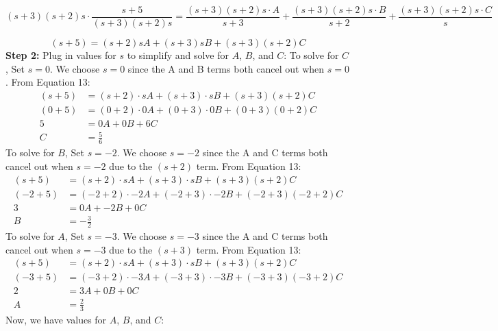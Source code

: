 \documentclass{article}
\begin{document}
\begin{equation}
(s+3)(s+2)s \cdot \frac{s + 5}{(s+3)(s+2)s} =  \frac{(s+3)(s+2)s \cdot A}{s+3} + \frac{(s+3)(s+2)s \cdot B}{s+2} + \frac{(s+3)(s+2)s \cdot C}{s}
\end{equation}

\begin{equation}
(s + 5) = (s+2)s A + (s+3)s B + (s+3)(s+2) C
\end{equation}
\newline
\textbf{Step 2:} Plug in values for \(s\) to simplify and solve for \(A\), \(B\), and \(C\):
\newline
\newline
To solve for \(C\), Set \(s = 0\). We choose \(s = 0\) since the A and B terms both cancel out when \(s = 0\).
\newline
From Equation 13:
\begin{align}
(s + 5) &= (s + 2) \cdot s A + (s + 3) \cdot s B + (s+3)(s+2) C \nonumber \\
(0 + 5) &= (0 + 2) \cdot 0 A + (0 + 3) \cdot 0 B + (0+3)(0+2) C \\
5 &= 0 A + 0 B + 6 C \nonumber \\
C &= \frac{5}{6} \nonumber
\end{align}
\newline
To solve for \(B\), Set \(s = -2\). We choose \(s = -2\) since the A and C terms both cancel out when \(s = -2\) due to the \((s+2)\) term.
From Equation 13:
\begin{align}
(s + 5) &= (s + 2) \cdot s A + (s + 3) \cdot s B + (s+3)(s+2) C \nonumber \\
(-2 + 5) &= (-2 + 2) \cdot -2 A + (-2 + 3) \cdot -2 B + (-2+3)(-2+2) C \\
3 &= 0 A + -2 B + 0 C \nonumber \\
B &= -\frac{3}{2} \nonumber
\end{align}
\newline
To solve for \(A\), Set \(s = -3\). We choose \(s = -3\) since the A and C terms both cancel out when \(s = -3\) due to the \((s+3)\) term.
From Equation 13:
\begin{align}
(s + 5) &= (s + 2) \cdot s A + (s + 3) \cdot s B + (s+3)(s+2) C \nonumber \\
(-3 + 5) &= (-3 + 2) \cdot -3 A + (-3 + 3) \cdot -3 B + (-3+3)(-3+2) C \\
2 &= 3 A + 0 B + 0 C \nonumber \\
A &= \frac{2}{3} \nonumber
\end{align}
\newline
Now, we have values for \(A\), \(B\), and \(C\):
\end{document}
